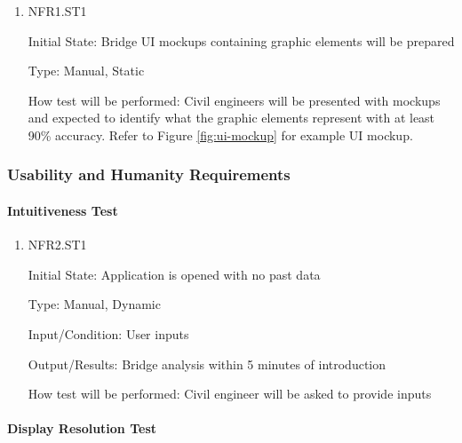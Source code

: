 \documentclass[12pt, titlepage]{article}
\begin{document}
\begin{enumerate}

\item{NFR1.ST1\\}

Initial State: Bridge UI mockups containing graphic elements will be prepared

Type: Manual, Static

How test will be performed: Civil engineers will be presented with mockups and expected to identify what the graphic elements represent with at least 90\% accuracy. Refer to Figure \ref{fig:ui-mockup} for example UI mockup.

\end{enumerate}

\subsubsection{Usability and Humanity Requirements}
		
\paragraph{Intuitiveness Test}

\begin{enumerate}

\item{NFR2.ST1\\}

Initial State: Application is opened with no past data

Type: Manual, Dynamic

Input/Condition: User inputs

Output/Results: Bridge analysis within 5 minutes of introduction

How test will be performed: Civil engineer will be asked to provide inputs

\end{enumerate}
		
\paragraph{Display Resolution Test}
\end{document}
